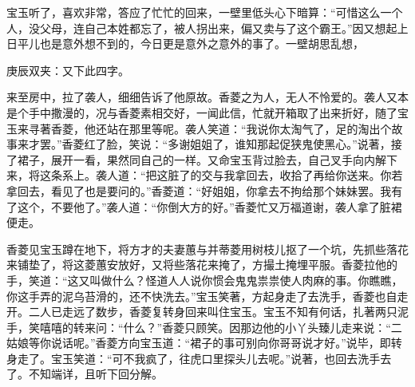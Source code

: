 \begin{parag}
    宝玉听了，喜欢非常，答应了忙忙的回来，一壁里低头心下暗算：“可惜这么一个人，没父母，连自己本姓都忘了，被人拐出来，偏又卖与了这个霸王。”因又想起上日平儿也是意外想不到的，今日更是意外之意外的事了。一壁胡思乱想，\begin{note}庚辰双夹：又下此四字。\end{note}来至房中，拉了袭人，细细告诉了他原故。香菱之为人，无人不怜爱的。袭人又本是个手中撒漫的，况与香菱素相交好，一闻此信，忙就开箱取了出来折好，随了宝玉来寻著香菱，他还站在那里等呢。袭人笑道：“我说你太淘气了，足的淘出个故事来才罢。”香菱红了脸，笑说：“多谢姐姐了，谁知那起促狭鬼使黑心。”说著，接了裙子，展开一看，果然同自己的一样。又命宝玉背过脸去，自己叉手向内解下来，将这条系上。袭人道：“把这脏了的交与我拿回去，收拾了再给你送来。你若拿回去，看见了也是要问的。”香菱道：“好姐姐，你拿去不拘给那个妹妹罢。我有了这个，不要他了。”袭人道：“你倒大方的好。”香菱忙又万福道谢，袭人拿了脏裙便走。
\end{parag}


\begin{parag}
    香菱见宝玉蹲在地下，将方才的夫妻蕙与并蒂菱用树枝儿抠了一个坑，先抓些落花来铺垫了，将这菱蕙安放好，又将些落花来掩了，方撮土掩埋平服。香菱拉他的手，笑道：“这又叫做什么？怪道人人说你惯会鬼鬼祟祟使人肉麻的事。你瞧瞧，你这手弄的泥乌苔滑的，还不快洗去。”宝玉笑著，方起身走了去洗手，香菱也自走开。二人已走远了数步，香菱复转身回来叫住宝玉。宝玉不知有何话，扎著两只泥手，笑嘻嘻的转来问：“什么？”香菱只顾笑。因那边他的小丫头臻儿走来说：“二姑娘等你说话呢。”香菱方向宝玉道：“裙子的事可别向你哥哥说才好。”说毕，即转身走了。宝玉笑道：“可不我疯了，往虎口里探头儿去呢。”说著，也回去洗手去了。不知端详，且听下回分解。
\end{parag}